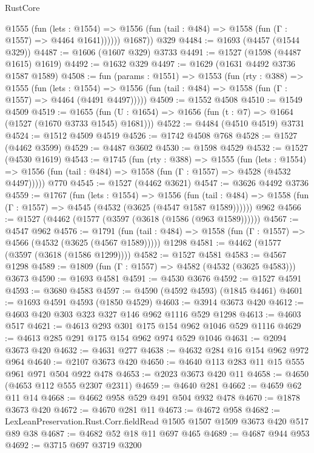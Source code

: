 \begin{lexlean}{RustCore}
\begin{coremodule}
            @1555
              (fun (lets : @1554) =>
              @1556 (fun (tail : @484) => @1558 (fun (Γ : @1557) => @4464 @1641))))))
        @1687))
    @329
@4484 := @1693 (@4457 (@1544 @329))
@4487 := @1606 (@1607 @329) @3733
@4491 := @1527 (@1598 (@4487 @1615) @1619)
@4492 := @1632 @329
@4497 := @1629 (@1631 @4492 @3736 @1587 @1589)
@4508 := fun (params : @1551) =>
  @1553
    (fun (rty : @388) =>
    @1555
      (fun (lets : @1554) =>
      @1556 (fun (tail : @484) => @1558 (fun (Γ : @1557) => @4464 (@4491 @4497)))))
@4509 := @1552 @4508
@4510 := @1549 @4509
@4519 := @1655 (fun (U : @1654) => @1656 (fun (t : @7) => @1664 (@1527 (@1670 @3733 @1545) @1681)))
@4522 := @4484 (@4510 @4519) @3731
@4524 := @1512 @4509 @4519
@4526 := @1742 @4508 @768
@4528 := @1527 (@4462 @3599)
@4529 := @4487 @3602
@4530 := @1598 @4529
@4532 := @1527 (@4530 @1619)
@4543 := @1745
    (fun (rty : @388) =>
    @1555
      (fun (lets : @1554) =>
      @1556 (fun (tail : @484) => @1558 (fun (Γ : @1557) => @4528 (@4532 @4497)))))
    @770
@4545 := @1527 (@4462 @3621)
@4547 := @3626 @4492 @3736
@4559 := @1767
    (fun (lets : @1554) =>
    @1556
      (fun (tail : @484) => @1558 (fun (Γ : @1557) => @4545 (@4532 (@3625 (@4547 @1587 @1589))))))
    @962
@4566 := @1527 (@4462 (@1577 (@3597 (@3618 (@1586 (@963 @1589))))))
@4567 := @4547 @962
@4576 := @1791
    (fun (tail : @484) => @1558 (fun (Γ : @1557) => @4566 (@4532 (@3625 (@4567 @1589)))))
    @1298
@4581 := @4462 (@1577 (@3597 (@3618 (@1586 @1299))))
@4582 := @1527 @4581
@4583 := @4567 @1298
@4589 := @1809 (fun (Γ : @1557) => @4582 (@4532 (@3625 @4583))) @3673
@4590 := @1693 @4581
@4591 := @4530 @3676
@4592 := @1527 @4591
@4593 := @3680 @4583
@4597 := @4590 (@4592 @4593) (@1845 @4461)
@4601 := @1693 @4591 @4593 (@1850 @4529)
@4603 := @3914 @3673 @420
@4612 := @4603 @420 @303 @323 @327 @146 @962 @1116 @529 @1298
@4613 := @4603 @517
@4621 := @4613 @293 @301 @175 @154 @962 @1046 @529 @1116
@4629 := @4613 @285 @291 @175 @154 @962 @974 @529 @1046
@4631 := @2094 @3673 @420
@4632 := @4631 @277
@4638 := @4632 @284 @16 @154 @962 @972 @964
@4640 := @2107 @3673 @420
@4650 := @4640 @113 @283 @11 @15 @555 @961 @971 @504 @922 @478
@4653 := @2023 @3673 @420 @11
@4658 := @4650 (@4653 @112 @555 @2307 @2311)
@4659 := @4640 @281
@4662 := @4659 @62 @11 @14
@4668 := @4662 @958 @529 @491 @504 @932 @478
@4670 := @1878 @3673 @420
@4672 := @4670 @281 @11
@4673 := @4672 @958
@4682 := LexLeanPreservation.Rust.Corr.fieldRead @1505 @1507 @1509 @3673 @420 @517 @89 @38
@4687 := @4682 @52 @18 @11 @697 @465
@4689 := @4687 @944 @953
@4692 := @3715 @697 @3719 @3200

\end{coremodule}
\end{lexlean}
